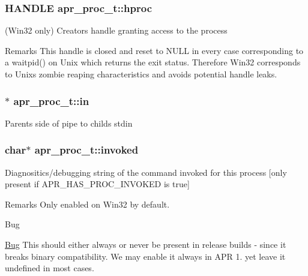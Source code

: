 \subsubsection[{\texorpdfstring{hproc}{hproc}}]{\setlength{\rightskip}{0pt plus 5cm}H\+A\+N\+D\+LE apr\+\_\+proc\+\_\+t\+::hproc}\hypertarget{structapr__proc__t_aa1f17cce2b442d92893b9c63053b6771}{}\label{structapr__proc__t_aa1f17cce2b442d92893b9c63053b6771}
(Win32 only) Creator\textquotesingle{}s handle granting access to the process \begin{DoxyRemark}{Remarks}
This handle is closed and reset to N\+U\+LL in every case corresponding to a waitpid() on Unix which returns the exit status. Therefore Win32 correspond\textquotesingle{}s to Unix\textquotesingle{}s zombie reaping characteristics and avoids potential handle leaks. 
\end{DoxyRemark}
\subsubsection[{\texorpdfstring{in}{in}}]{$\ast$ apr\+\_\+proc\+\_\+t\+::in}\hypertarget{structapr__proc__t_a914bda8939f9d17c9e2f238683fb994b}{}\label{structapr__proc__t_a914bda8939f9d17c9e2f238683fb994b}
Parent\textquotesingle{}s side of pipe to child\textquotesingle{}s stdin 
\subsubsection[{\texorpdfstring{invoked}{invoked}}]{\setlength{\rightskip}{0pt plus 5cm}char$\ast$ apr\+\_\+proc\+\_\+t\+::invoked}\hypertarget{structapr__proc__t_a72ed1c58c3f08ffa7202fa80e870cd54}{}\label{structapr__proc__t_a72ed1c58c3f08ffa7202fa80e870cd54}
Diagnositics/debugging string of the command invoked for this process \mbox{[}only present if A\+P\+R\+\_\+\+H\+A\+S\+\_\+\+P\+R\+O\+C\+\_\+\+I\+N\+V\+O\+K\+ED is true\mbox{]} \begin{DoxyRemark}{Remarks}
Only enabled on Win32 by default. 
\end{DoxyRemark}
\begin{DoxyRefDesc}{Bug}
\item[\hyperlink{bug__bug000011}{Bug}]This should either always or never be present in release builds -\/ since it breaks binary compatibility. We may enable it always in A\+PR 1. yet leave it undefined in most cases. \end{DoxyRefDesc}
